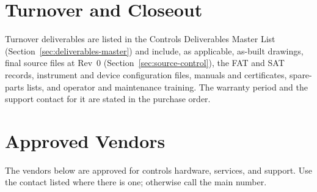 \section[Turnover and Closeout]{Turnover and Closeout \newmark}\label{sec:contractor-turnover}
Turnover deliverables are listed in the Controls Deliverables Master List (Section~\ref{sec:deliverables-master}) and include, as applicable, as-built drawings, final source files at Rev~0 (Section~\ref{sec:source-control}), the FAT and SAT records, instrument and device configuration files, manuals and certificates, spare-parts lists, and operator and maintenance training. The warranty period and the support contact for it are stated in the purchase order.

\section{Approved Vendors}\label{sec:vendors}
The vendors below are approved for controls hardware, services, and support. Use the contact listed where there is one; otherwise call the main number.


